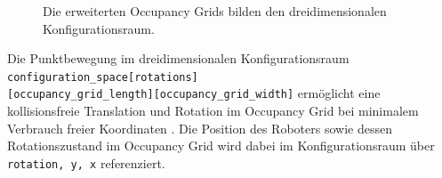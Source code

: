 \vspace*{0.46cm}
\begin{figure}[H]
	\centering
	\footnotesize
	\centerline{}
	\caption{Die erweiterten Occupancy Grids bilden den dreidimensionalen Konfigurationsraum.}
\end{figure}

Die Punktbewegung im dreidimensionalen Konfigurationsraum \texttt{configuration\_space[rotations]}\\\texttt{[occupancy\_grid\_length][occupancy\_grid\_width]} ermöglicht eine kollisionsfreie Translation und Rotation im Occupancy Grid bei minimalem Verbrauch freier Koordinaten \cite{wang.2000}. 
Die Position des Roboters sowie dessen Rotationszustand im Occupancy Grid wird dabei im Konfigurationsraum über \texttt{rotation, y, x} referenziert.


